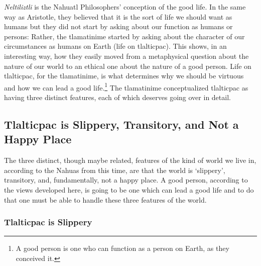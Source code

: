 \emph{Neltiliztli} is the Nahuatl Philosophers' conception of the good life. In the same way as Aristotle, they believed that it is the sort of life we should want as humans but they did not start by asking about our function as humans or persons: Rather, the tlamatinime started by asking about the character of our circumstances as humans on Earth (life on tlalticpac). This shows, in an interesting way, how they easily moved from a metaphysical question about the nature of our world to an ethical one about the nature of a good person. Life on tlalticpac, for the tlamatinime, is what determines why we should be virtuous and how we can lead a good life.\footnote{A good person is one who can function as a person on Earth, as they conceived it.} The tlamatinime conceptualized tlalticpac as having three distinct features, each of which deserves going over in detail.

\subsection{Tlalticpac is Slippery, Transitory, and Not a Happy Place} 

The three distinct, though maybe related, features of the kind of world we live in, according to the Nahuas from this time, are that the world is `slippery', transitory, and, fundamentally, not a happy place. A good person, according to the views developed here, is going to be one which can lead a good life and to do that one must be able to handle these three features of the world. 

\subsubsection{Tlalticpac is Slippery}

